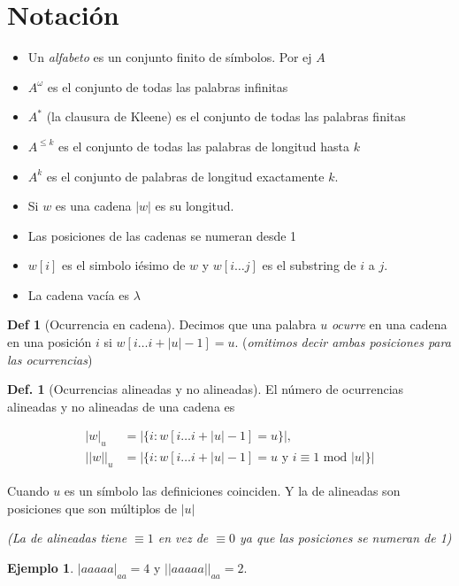\documentclass{report}
\theoremstyle{definition} %
\newtheorem{definition}{Def.}[chapter]
\newtheorem*{definition*}{Def}
\newtheorem*{exmp*}{Ejemplo}
\begin{document}
\section{Notación}

\begin{itemize}
    \item Un \textit{alfabeto} es un conjunto finito de símbolos. Por ej $A$
    \item $A^\omega$ es el conjunto de todas las palabras infinitas
    \item $A^*$ (la clausura de Kleene) es el conjunto de todas las palabras finitas
    \item $A^{\leq k}$ es el conjunto de todas las palabras de longitud hasta $k$
    \item $A^{k}$ es el conjunto de palabras de longitud exactamente $k$.
    \item Si $w$ es una cadena $|w|$ es su longitud.
    \item Las posiciones de las cadenas se numeran desde 1
    \item $w[i]$ es el simbolo iésimo de $w$ y $w[i\dots j]$ es el substring de
    $i$ a $j$.
    \item La cadena vacía es $\lambda$
\end{itemize}

\begin{definition*}[Ocurrencia en cadena]
    Decimos que una palabra $u$ \textit{ocurre} en una cadena en una posición
    $i$ si $w[i\dots i+|u|-1] = u$. (\textit{omitimos decir ambas posiciones
    para las ocurrencias})
\end{definition*}


\begin{definition}[Ocurrencias alineadas y no alineadas]
    El número de ocurrencias alineadas y no alineadas de una cadena es

    \begin{align*}
        |w|_u &= |\{ i : w[i\dots i+|u| - 1] = u\}|,\\
        ||w||_u &= |\{ i : w[i\dots i+|u| - 1] = u \text{ y } i \equiv 1 \text{ mod } |u|\}|
    \end{align*}

    Cuando $u$ es un símbolo las definiciones coinciden. Y la de alineadas son
    posiciones que son múltiplos de $|u|$

    \textit{(La de alineadas tiene $\equiv 1$ en vez de $\equiv 0$ ya que las posiciones se numeran de 1)}
    
    \begin{exmp*}
        $|aaaaa|_{aa} = 4$ y $||aaaaa||_{aa} = 2$.
    \end{exmp*}

\end{definition}
\end{document}
